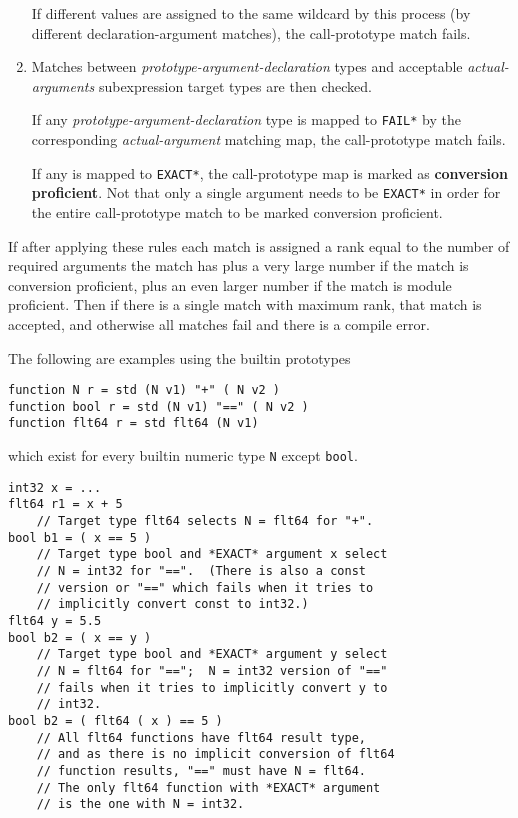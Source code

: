 \documentclass[12pt]{article}
\newcommand{\key}[1]{{\rm \bfseries #1}}
\newenvironment{indpar}[1][0.3in]%
	{\begin{list}{}%
		     {\setlength{\itemsep}{0in}%
		      \setlength{\topsep}{0in}%
		      \setlength{\parsep}{1ex}%
		      \setlength{\labelwidth}{#1}%
		      \setlength{\leftmargin}{#1}%
		      \addtolength{\leftmargin}{\labelsep}}%
	 \item}%
	{\end{list}}
\begin{document}
\begin{enumerate}
If different values are assigned to the same wildcard by this
process (by different declaration-argument matches),
the call-prototype match fails.

\item\label{CALL-PROTOTYPE-ARGUMENT-TYPING}
Matches between {\em prototype-argument-declaration} types
and acceptable {\em actual-argu\-ments} subexpression target types
are then checked.

If any {\em prototype-argument-declaration} type is mapped to
{\tt *FAIL*} by the corresponding {\em actual-argument} matching map,
the call-prototype match fails.

If any is mapped to {\tt *EXACT*}, the call-prototype map is
marked as \key{conversion proficient}.  Not that only a single
argument needs to be {\tt *EXACT*} in order for the entire
call-prototype match to be marked conversion proficient.

\end{enumerate}

If after applying these rules each match is assigned a rank
equal to the number of required arguments the match has
plus a very large number if the match is conversion proficient,
plus an even larger number if the match is module proficient.
Then if there is a single match with maximum rank, that match
is accepted, and otherwise all matches fail and there is
a compile error.

The following are examples using the builtin prototypes
\begin{indpar}
{\tt function N r = std (N v1) "+" ( N v2 )} \\
{\tt function bool r = std (N v1) "==" ( N v2 )} \\
{\tt function flt64 r = std flt64 (N v1)}
\end{indpar}
which exist for every builtin numeric type {\tt N} except
{\tt bool}.
\begin{indpar}[1em]\begin{verbatim}
int32 x = ...
flt64 r1 = x + 5
    // Target type flt64 selects N = flt64 for "+".
bool b1 = ( x == 5 )
    // Target type bool and *EXACT* argument x select
    // N = int32 for "==".  (There is also a const
    // version or "==" which fails when it tries to
    // implicitly convert const to int32.)
flt64 y = 5.5
bool b2 = ( x == y )
    // Target type bool and *EXACT* argument y select
    // N = flt64 for "==";  N = int32 version of "=="
    // fails when it tries to implicitly convert y to
    // int32.
bool b2 = ( flt64 ( x ) == 5 )
    // All flt64 functions have flt64 result type,
    // and as there is no implicit conversion of flt64
    // function results, "==" must have N = flt64.
    // The only flt64 function with *EXACT* argument
    // is the one with N = int32.
\end{verbatim}\end{indpar}
\end{document}
